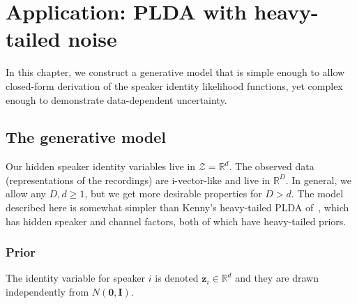 \documentclass[a4paper,oneside,12pt,english]{report}
\def\zvec{\mathbf{z}}
\def\R{\mathbb{R}}
\def\Zset{\mathcal{Z}}
\def\Imat{\mathbf{I}}
\def\Zset{\mathcal{Z}}
\def\nulvec{\boldsymbol{0}}
\begin{document}
\chapter{Application: PLDA with heavy-tailed noise}
In this chapter, we construct a generative model that is simple enough to allow closed-form derivation of the speaker identity likelihood functions, yet complex enough to demonstrate data-dependent uncertainty.

\section{The generative model}
Our hidden speaker identity variables live in $\Zset=\R^d$. The observed data (representations of the recordings) are i-vector-like and live in $\R^D$. In general, we allow any $D,d\ge1$, but we get more desirable properties for $D>d$. The model described here is somewhat simpler than Kenny's heavy-tailed PLDA of~\cite{ht-plda}, which has hidden speaker and channel factors, both of which have heavy-tailed priors. 

\subsection{Prior}
The identity variable for speaker $i$ is denoted $\zvec_i\in\R^d$ and they are drawn independently from $N(\nulvec,\Imat)$. 
\end{document}
